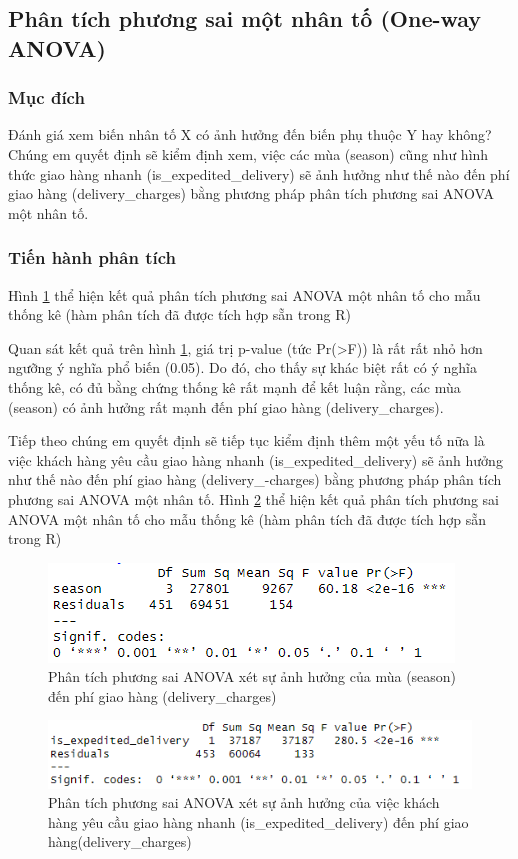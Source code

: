 \subsection{Phân tích phương sai một nhân tố (One-way ANOVA)} \label{anova1}
\subsubsection{Mục đích}
Đánh giá xem biến nhân tố X có ảnh hưởng đến biến phụ thuộc Y hay không? Chúng em quyết định sẽ kiểm định xem, việc các mùa (season) cũng như hình thức giao hàng nhanh (is\_expedited\_delivery) sẽ ảnh hưởng như thế nào đến phí giao hàng (delivery\_charges) bằng phương pháp phân tích phương sai ANOVA một nhân tố.
\subsubsection{Tiến hành phân tích}
Hình \ref{fig:5.1} thể hiện kết quả phân tích phương sai ANOVA một nhân tố cho mẫu thống kê (hàm phân tích đã được tích hợp sẵn trong R)

Quan sát kết quả trên hình \ref{fig:5.1}, giá trị p-value (tức Pr(>F)) là rất rất nhỏ hơn ngưỡng ý nghĩa phổ biến (0.05). Do đó, cho thấy sự
khác biệt rất có ý nghĩa thống kê, có đủ bằng chứng thống kê rất mạnh để kết luận rằng, các mùa (season) có ảnh hưởng rất mạnh đến phí giao hàng (delivery\_charges).

Tiếp theo chúng em quyết định sẽ tiếp tục kiểm định thêm một yếu tố nữa là việc khách hàng yêu cầu giao hàng nhanh (is\_expedited\_delivery) sẽ ảnh hưởng như thế nào đến phí giao hàng (delivery\_-charges) bằng phương pháp phân tích phương sai ANOVA một nhân tố. Hình \ref{fig:5.2} thể hiện kết quả phân tích phương sai ANOVA một nhân tố cho mẫu thống kê (hàm phân tích đã được tích hợp sẵn trong R)
\begin{figure}[!htbp]
    \centering
    \includegraphics[width=0.6\linewidth]{graphics/5.3.1.png}
    \caption{Phân tích phương sai ANOVA xét sự ảnh hưởng của mùa (season) đến phí giao hàng (delivery\_charges)}
    \label{fig:5.1}
\end{figure}

\begin{figure}[!htbp]
    \centering
    \includegraphics[width=0.7\linewidth]{graphics/5.3.2.png}
    \caption{Phân tích phương sai ANOVA xét sự ảnh hưởng của việc khách hàng yêu cầu giao hàng nhanh (is\_expedited\_delivery) đến phí giao hàng(delivery\_charges)}
    \label{fig:5.2}
\end{figure}

